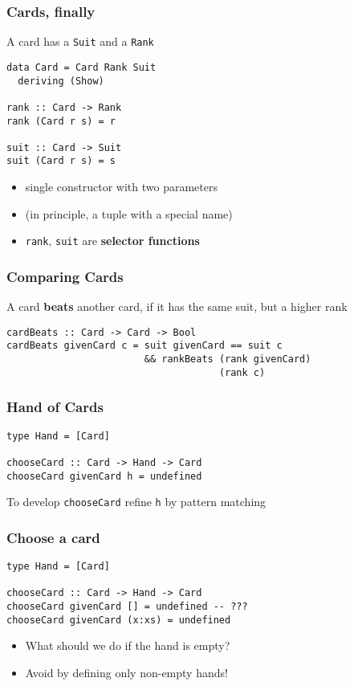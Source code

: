 \documentclass{beamer}
\begin{document}
\begin{frame}[fragile]
  \frametitle{Cards, finally}
  A card has a \texttt{Suit} and a \texttt{Rank}
\begin{verbatim}
data Card = Card Rank Suit
  deriving (Show)

rank :: Card -> Rank
rank (Card r s) = r

suit :: Card -> Suit
suit (Card r s) = s
\end{verbatim}
  \begin{itemize}
  \item single constructor with two parameters
  \item  (in principle, a tuple with a special name)
  \item \texttt{rank}, \texttt{suit} are \textbf{selector functions}
  \end{itemize}
\end{frame}
\begin{frame}[fragile]
  \frametitle{Comparing Cards}
  A card \textbf{beats} another card, if it has the same
  suit, but a higher rank
\begin{verbatim}
cardBeats :: Card -> Card -> Bool
cardBeats givenCard c = suit givenCard == suit c
                        && rankBeats (rank givenCard)
                                     (rank c)
\end{verbatim}
\end{frame}
\begin{frame}[fragile]
  \frametitle{Hand of Cards}
\begin{verbatim}
type Hand = [Card]

chooseCard :: Card -> Hand -> Card
chooseCard givenCard h = undefined
\end{verbatim}
  To develop \texttt{chooseCard} refine \texttt{h} by pattern matching
\end{frame}
\begin{frame}[fragile]
  \frametitle{Choose a card}
\begin{verbatim}
type Hand = [Card]

chooseCard :: Card -> Hand -> Card
chooseCard givenCard [] = undefined -- ???
chooseCard givenCard (x:xs) = undefined
\end{verbatim}
  \begin{itemize}
  \item What should we do if the hand is empty?
  \item Avoid by defining only non-empty hands!
  \end{itemize}
\end{frame}
\end{document}
